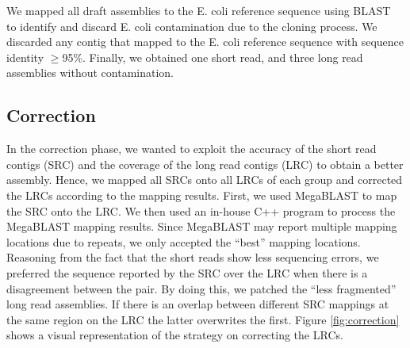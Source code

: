 \documentclass{llncs}
\begin{document}
We mapped all draft assemblies to the E. coli reference sequence using BLAST~\cite{blast} to identify and discard E. coli contamination due to the cloning process. We discarded any contig that mapped to the E. coli reference sequence with sequence identity $\geq$95\%. Finally, we obtained one short read, and three long read assemblies without contamination.

\subsection{Correction} 
In the correction phase, we wanted to exploit the accuracy of the short read contigs (SRC) and the coverage of the long read contigs (LRC) to obtain a better assembly. 
Hence, we mapped all SRCs onto all LRCs of each group and corrected the LRCs according to the mapping results.
First, we used MegaBLAST \cite{megablast} to map the SRC onto the LRC.
We then used an in-house C++ program to process the MegaBLAST mapping results. 
Since MegaBLAST may report multiple mapping locations due to repeats, we only accepted the ``best'' mapping locations. 
Reasoning from the fact that the short reads show less sequencing errors, we preferred the sequence reported by the SRC over the LRC when there is a disagreement between the pair. 
By doing this, we patched the ``less fragmented'' long read assemblies. 
If there is an overlap between different SRC mappings at the same region on the LRC the latter overwrites the first. 
Figure \ref{fig:correction} shows a visual representation of the strategy on correcting the LRCs. 
\end{document}

